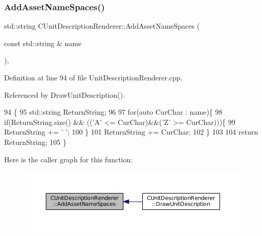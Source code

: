\subsubsection{\texorpdfstring{Add\+Asset\+Name\+Spaces()}{AddAssetNameSpaces()}}
{\footnotesize\ttfamily std\+::string C\+Unit\+Description\+Renderer\+::\+Add\+Asset\+Name\+Spaces (\begin{DoxyParamCaption}\item[{const std\+::string \&}]{name }\end{DoxyParamCaption})\hspace{0.3cm}{\ttfamily [static]}, {\ttfamily [protected]}}



Definition at line 94 of file Unit\+Description\+Renderer.\+cpp.



Referenced by Draw\+Unit\+Description().


\begin{DoxyCode}
94                                                                            \{
95     std::string ReturnString;
96     
97     \textcolor{keywordflow}{for}(\textcolor{keyword}{auto} CurChar : name)\{
98         \textcolor{keywordflow}{if}(ReturnString.size() && ((\textcolor{charliteral}{'A'} <= CurChar)&&(\textcolor{charliteral}{'Z'} >= CurChar)))\{
99             ReturnString += \textcolor{charliteral}{' '};   
100         \}
101         ReturnString += CurChar;
102     \}
103     
104     \textcolor{keywordflow}{return} ReturnString;
105 \}
\end{DoxyCode}
Here is the caller graph for this function\+:\nopagebreak
\begin{figure}[H]
\begin{center}
\leavevmode
\includegraphics[width=350pt]{classCUnitDescriptionRenderer_ae18d6862ae305bd5633558f86457270b_icgraph}
\end{center}
\end{figure}
\hypertarget{classCUnitDescriptionRenderer_a1faaa0097504c0ccf2f8017449324377}{}\label{classCUnitDescriptionRenderer_a1faaa0097504c0ccf2f8017449324377} 
